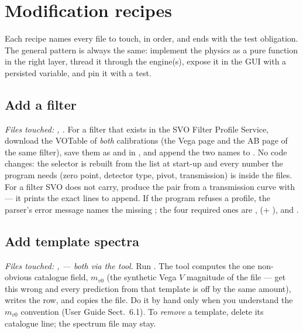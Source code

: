 \section{Modification recipes}
\label{sec:extending}

Each recipe names every file to touch, in order, and ends with the test
obligation. The general pattern is always the same: implement the physics
as a pure function in the right layer, thread it through the engine(s),
expose it in the GUI with a persisted variable, and pin it with a test.

\subsection{Add a filter}

\emph{Files touched: , .}
For a filter that exists in the SVO Filter Profile Service, download the
VOTable of \emph{both} calibrations (the Vega page and the AB page of the
same filter), save them as  and
 in , and append the two
names to . No code changes: the selector is
rebuilt from the list at start-up and every number the program needs
(zero point, detector type, pivot, transmission) is inside the files.
For a filter SVO does not carry, produce the pair from a transmission
curve with  --- it prints the exact lines
to append. If the program refuses a profile, the parser's error message
names the missing ; the four required ones are
,  (+ ),
 and .

\subsection{Add template spectra}

\emph{Files touched: ,  --- both
via the tool.} Run .
The tool computes the one non-obvious catalogue field, $m_{v0}$ (the
synthetic Vega $V$ magnitude of the file --- get this wrong and every
prediction from that template is off by the same amount), writes the
row, and copies the file. Do it by hand only when you understand the
$m_{v0}$ convention (User Guide Sect.~6.1). To \emph{remove} a template,
delete its catalogue line; the spectrum file may stay.

